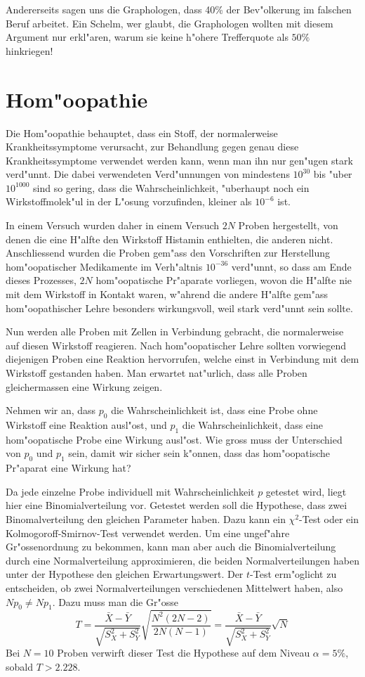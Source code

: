 Andererseits sagen uns die Graphologen, dass 40\% der Bev"olkerung im falschen
Beruf arbeitet.
Ein Schelm, wer glaubt,
die Graphologen wollten mit diesem
Argument nur erkl"aren, warum sie keine h"ohere Trefferquote als $50\%$ hinkriegen!


\section{Hom"oopathie}
Die Hom"oopathie behauptet, dass ein Stoff, der normalerweise Krankheitssymptome
verursacht, zur Behandlung gegen genau diese Krankheitssymptome verwendet werden
kann, wenn man ihn nur gen"ugen stark verd"unnt. Die dabei verwendeten
Verd"unnungen von mindestens $10^{30}$ bis "uber $10^{1000}$ sind so gering,
dass die Wahrscheinlichkeit, "uberhaupt noch ein Wirkstoffmolek"ul in der
L"osung vorzufinden, kleiner als $10^{-6}$ ist.

In einem Versuch wurden daher in einem Versuch $2N$ Proben hergestellt,
von denen die eine H"alfte den Wirkstoff Histamin enthielten, die anderen 
nicht. Anschliessend wurden die Proben gem"ass den Vorschriften zur
Herstellung hom"oopatischer Medikamente im Verh"altnis $10^{-36}$
verd"unnt, so dass am Ende dieses Prozesses, $2N$ hom"oopatische
Pr"aparate vorliegen, wovon die H"alfte nie mit dem Wirkstoff in
Kontakt waren, w"ahrend die andere H"alfte gem"ass hom"oopathischer
Lehre besonders wirkungsvoll, weil stark verd"unnt sein sollte.

Nun werden alle Proben mit Zellen in Verbindung gebracht, die normalerweise
auf diesen Wirkstoff reagieren. Nach hom"oopatischer Lehre sollten vorwiegend
diejenigen Proben eine Reaktion hervorrufen, welche einst in Verbindung
mit dem Wirkstoff gestanden haben. Man erwartet nat"urlich, dass 
alle Proben gleichermassen eine Wirkung zeigen.

Nehmen wir an, dass $p_0$ die Wahrscheinlichkeit ist, dass eine Probe ohne
Wirkstoff eine Reaktion ausl"ost, und $p_1$ die Wahrscheinlichkeit, dass
eine hom"oopatische Probe eine Wirkung ausl"ost. Wie gross muss der Unterschied
von $p_0$ und $p_1$ sein, damit wir sicher sein k"onnen, dass das hom"oopatische
Pr"aparat eine Wirkung hat?

Da jede einzelne Probe individuell mit Wahrscheinlichkeit $p$ getestet wird, liegt
hier eine Binomialverteilung vor. Getestet werden soll die Hypothese, dass zwei
Binomalverteilung den gleichen Parameter haben. Dazu kann ein $\chi^2$-Test oder
ein Kolmogoroff-Smirnov-Test verwendet werden. Um eine ungef"ahre Gr"ossenordnung
zu bekommen, kann man aber auch die Binomialverteilung durch eine Normalverteilung
approximieren, die beiden Normalverteilungen haben unter der Hypothese den
gleichen Erwartungswert.
Der $t$-Test erm"oglicht zu entscheiden, ob zwei Normalverteilungen
verschiedenen Mittelwert haben, also $Np_0\ne Np_1$. Dazu muss man die
Gr"osse
$$T=\frac{\bar X - \bar Y}{\sqrt{S_X^2+S_Y^2}}\sqrt{\frac{N^2(2N-2)}{{2N}{(N-1)}}}
=
\frac{\bar X - \bar Y}{\sqrt{S_X^2+S_Y^2}}\sqrt{N}$$
Bei $N=10$ Proben verwirft dieser Test die Hypothese
auf dem Niveau $\alpha=5\%$, sobald
$T>2.228$.


